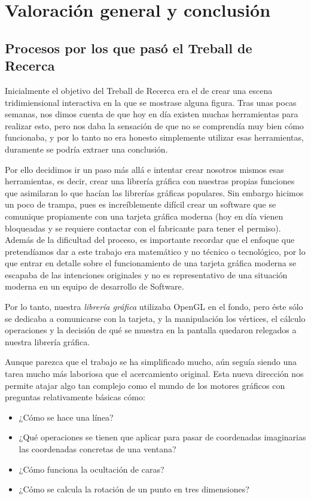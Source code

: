 \chapter{Valoración general y conclusión}
\section{Procesos por los que pasó el Treball de Recerca}
Inicialmente el objetivo del Treball de Recerca era el de crear una escena tridimiensional interactiva en la que se mostrase alguna figura. Tras unas pocas semanas, nos dimos cuenta de que hoy en día existen muchas herramientas para realizar esto, pero nos daba la sensación de que no se comprendía muy bien cómo funcionaba, y por lo tanto no era honesto simplemente utilizar esas herramientas, duramente se podría extraer una conclusión.

Por ello decidimos ir un paso más allá e intentar crear nosotros mismos esas herramientas, es decir, crear una librería gráfica con nuestras propias funciones que asimilaran lo que hacían las librerías gráficas populares. Sin embargo hicimos un poco de trampa, pues es increíblemente difícil crear un software que se comunique propiamente con una tarjeta gráfica moderna (hoy en día vienen bloqueadas y se requiere contactar con el fabricante para tener el permiso). Además de la dificultad del proceso, es importante recordar que el enfoque que pretendíamos dar a este trabajo era matemático y no técnico o tecnológico, por lo que entrar en detalle sobre el funcionamiento de una tarjeta gráfica moderna se escapaba de las intenciones originales y no es representativo de una situación moderna en un equipo de desarrollo de Software.

Por lo tanto, nuestra \textit{librería gráfica} utilizaba OpenGL en el fondo, pero éste sólo se dedicaba a comunicarse con la tarjeta, y la manipulación los vértices, el cálculo operaciones y la decisión de qué se muestra en la pantalla quedaron relegados a nuestra librería gráfica.

Aunque parezca que el trabajo se ha simplificado mucho, aún seguía siendo una tarea mucho más laboriosa que el acercamiento original. Esta nueva dirección nos permite atajar algo tan complejo como el mundo de los motores gráficos con preguntas relativamente básicas cómo:
\begin{itemize}
\item{¿Cómo se hace una línea?}
\item{¿Qué operaciones se tienen que aplicar para pasar de coordenadas imaginarias las coordenadas concretas de una ventana?}
\item{¿Cómo funciona la ocultación de caras?}
\item{¿Cómo se calcula la rotación de un punto en tres dimensiones?}
\end{itemize}

